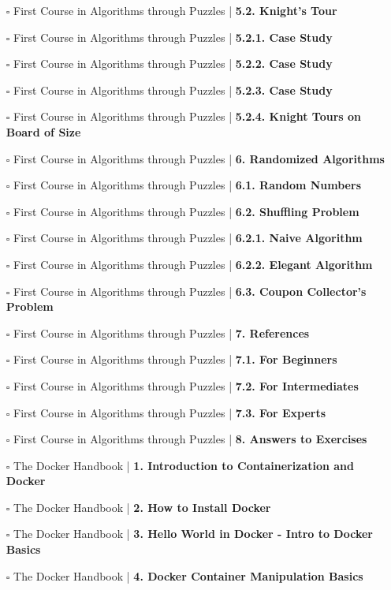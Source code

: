 \documentclass[a4, landscape, 12pt]{article}
\newcommand{\checkbox}{$\square$}%
\begin{document}
\begin{itemize}
{}
\item [\checkbox]  First Course in Algorithms through Puzzles | \textbf{ 5.2. Knight’s Tour
}
\item [\checkbox]  First Course in Algorithms through Puzzles | \textbf{ 5.2.1. Case Study
}
\item [\checkbox]  First Course in Algorithms through Puzzles | \textbf{ 5.2.2. Case Study
}
\item [\checkbox]  First Course in Algorithms through Puzzles | \textbf{ 5.2.3. Case Study
}
\item [\checkbox]  First Course in Algorithms through Puzzles | \textbf{ 5.2.4. Knight Tours on Board of Size
}
\item [\checkbox]  First Course in Algorithms through Puzzles | \textbf{ 6. Randomized Algorithms
}
\item [\checkbox]  First Course in Algorithms through Puzzles | \textbf{ 6.1. Random Numbers
}
\item [\checkbox]  First Course in Algorithms through Puzzles | \textbf{ 6.2. Shuffling Problem
}
\item [\checkbox]  First Course in Algorithms through Puzzles | \textbf{ 6.2.1. Naive Algorithm
}
\item [\checkbox]  First Course in Algorithms through Puzzles | \textbf{ 6.2.2. Elegant Algorithm
}
\item [\checkbox]  First Course in Algorithms through Puzzles | \textbf{ 6.3. Coupon Collector’s Problem
}
\item [\checkbox]  First Course in Algorithms through Puzzles | \textbf{ 7. References
}
\item [\checkbox]  First Course in Algorithms through Puzzles | \textbf{ 7.1. For Beginners
}
\item [\checkbox]  First Course in Algorithms through Puzzles | \textbf{ 7.2. For Intermediates
}
\item [\checkbox]  First Course in Algorithms through Puzzles | \textbf{ 7.3. For Experts
}
\item [\checkbox]  First Course in Algorithms through Puzzles | \textbf{ 8. Answers to Exercises
}
\item [\checkbox]  The Docker Handbook | \textbf{ 1. Introduction to Containerization and Docker
}
\item [\checkbox]  The Docker Handbook | \textbf{ 2. How to Install Docker
}
\item [\checkbox]  The Docker Handbook | \textbf{ 3. Hello World in Docker - Intro to Docker Basics
}
\item [\checkbox]  The Docker Handbook | \textbf{ 4. Docker Container Manipulation Basics
}
\end{itemize}
\end{document}
